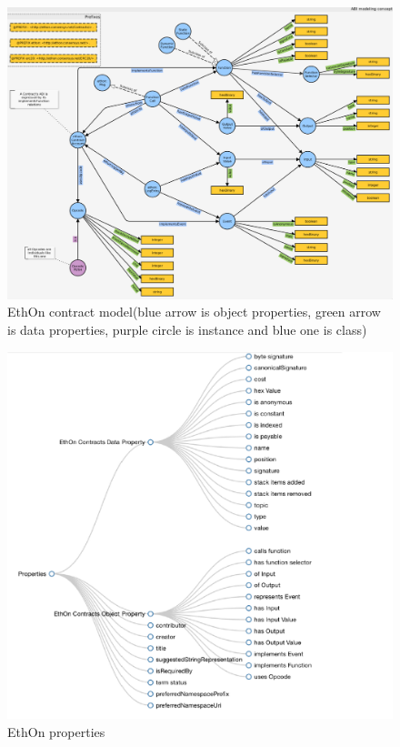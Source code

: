 \begin{center}
	
	\begin{figure}[htb!]
		
		\begin{minipage}{0.50\linewidth}
			\centering
			\includegraphics[width=1.80\textwidth]{images/chap2_EthOnContract.png}
		\end{minipage}
		\caption[EthOn classes]{EthOn contract model(blue arrow is object properties, green arrow is data properties, purple circle is instance and blue one is class) \cite{Rashid}}
		
	\end{figure}
	
	\begin{figure}[htb!]
		
		\begin{minipage}{0.55\linewidth}
			\centering
			\includegraphics[width=1.65\textwidth]{images/chap02_EthOn_Properties.png}
		\end{minipage}
		\caption[EthOn properties]{EthOn properties \cite{Rashid}}
		

\end{figure}
\end{center}
